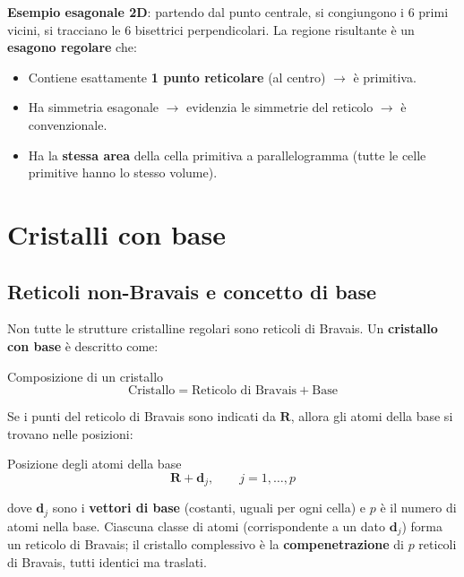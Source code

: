 \textbf{Esempio esagonale 2D}: partendo dal punto centrale, si congiungono i 6 primi vicini, si tracciano le 6 bisettrici perpendicolari. La regione risultante è un \textbf{esagono regolare} che:

\begin{itemize}
    \item Contiene esattamente \textbf{1 punto reticolare} (al centro) $\to$ è primitiva.
    \item Ha simmetria esagonale $\to$ evidenzia le simmetrie del reticolo $\to$ è convenzionale.
    \item Ha la \textbf{stessa area} della cella primitiva a parallelogramma (tutte le celle primitive hanno lo stesso volume).
\end{itemize}


\section{Cristalli con base}

\subsection*{Reticoli non-Bravais e concetto di base}

Non tutte le strutture cristalline regolari sono reticoli di Bravais. Un \textbf{cristallo con base} è descritto come:

\begin{equazione}{Composizione di un cristallo}
\begin{equation}
\text{Cristallo} = \text{Reticolo di Bravais} + \text{Base}
\end{equation}
\end{equazione}

Se i punti del reticolo di Bravais sono indicati da $\mathbf{R}$, allora gli atomi della base si trovano nelle posizioni:

\begin{equazione}{Posizione degli atomi della base}
\begin{equation}
\mathbf{R} + \mathbf{d}_j, \qquad j = 1, \ldots, p
\end{equation}
\end{equazione}

dove $\mathbf{d}_j$ sono i \textbf{vettori di base} (costanti, uguali per ogni cella) e $p$ è il numero di atomi nella base. Ciascuna classe di atomi (corrispondente a un dato $\mathbf{d}_j$) forma un reticolo di Bravais; il cristallo complessivo è la \textbf{compenetrazione} di $p$ reticoli di Bravais, tutti identici ma traslati.


